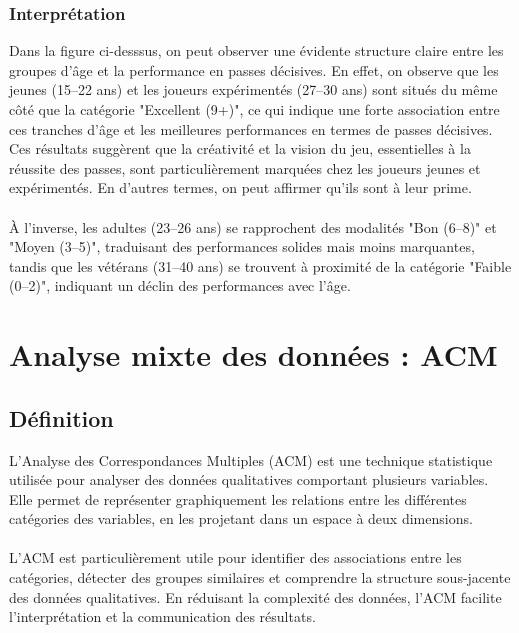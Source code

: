 \documentclass[12pt]{scrartcl}
\begin{document}
            \subsubsection{Interprétation}
                Dans la figure ci-desssus, on peut observer une évidente structure claire entre les groupes d’âge et la performance en passes décisives. En effet, on observe que les jeunes (15–22 ans) et les joueurs expérimentés (27–30 ans) sont situés du même côté que la catégorie "Excellent (9+)", ce qui indique une forte association entre ces tranches d’âge et les meilleures performances en termes de passes décisives. Ces résultats suggèrent que la créativité et la vision du jeu, essentielles à la réussite des passes, sont particulièrement marquées chez les joueurs jeunes et expérimentés. En d'autres termes, on peut affirmer qu'ils sont à leur prime.\\\\
                À l’inverse, les adultes (23–26 ans) se rapprochent des modalités "Bon (6–8)" et "Moyen (3–5)", traduisant des performances solides mais moins marquantes, tandis que les vétérans (31–40 ans) se trouvent à proximité de la catégorie "Faible (0–2)", indiquant un déclin des performances avec l’âge.



    \section{Analyse mixte des données : ACM}

        \subsection{Définition}
            L'Analyse des Correspondances Multiples (ACM) est une technique statistique utilisée pour analyser des données qualitatives comportant plusieurs variables. Elle permet de représenter graphiquement les relations entre les différentes catégories des variables, en les projetant dans un espace à deux dimensions.\\\\
            L'ACM est particulièrement utile pour identifier des associations entre les catégories, détecter des groupes similaires et comprendre la structure sous-jacente des données qualitatives. En réduisant la complexité des données, l'ACM facilite l'interprétation et la communication des résultats.
\end{document}
